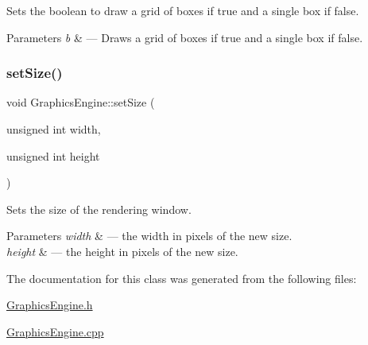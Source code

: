 Sets the boolean to draw a grid of boxes if true and a single box if false. 


\begin{DoxyParams}{Parameters}
{\em b} & --- Draws a grid of boxes if true and a single box if false. \\
\hline
\end{DoxyParams}
\mbox{\label{class_graphics_engine_aac1a9cc3d195ed1f28018dffd80dae41}} 
\subsubsection{\texorpdfstring{set\+Size()}{setSize()}}
{\footnotesize\ttfamily void Graphics\+Engine\+::set\+Size (\begin{DoxyParamCaption}\item[{unsigned int}]{width,  }\item[{unsigned int}]{height }\end{DoxyParamCaption})}



Sets the size of the rendering window. 


\begin{DoxyParams}{Parameters}
{\em width} & --- the width in pixels of the new size. \\
\hline
{\em height} & --- the height in pixels of the new size. \\
\hline
\end{DoxyParams}


The documentation for this class was generated from the following files\+:\begin{DoxyCompactItemize}
\item 
\hyperlink{_graphics_engine_8h}{Graphics\+Engine.\+h}\item 
\hyperlink{_graphics_engine_8cpp}{Graphics\+Engine.\+cpp}\end{DoxyCompactItemize}
